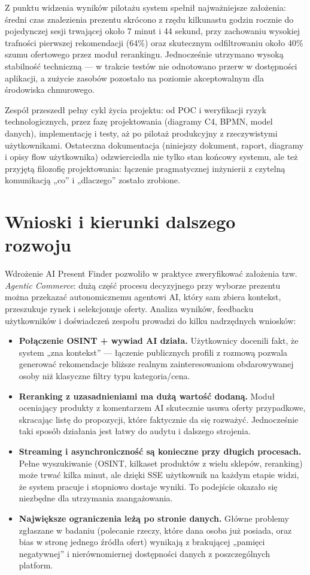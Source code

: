 \documentclass[12pt,a4paper]{article}
\begin{document}
Z punktu widzenia wyników pilotażu system spełnił najważniejsze założenia: średni czas znalezienia prezentu skrócono z rzędu kilkunastu godzin rocznie do pojedynczej sesji trwającej około 7 minut i 44 sekund, przy zachowaniu wysokiej trafności pierwszej rekomendacji (64\%) oraz skutecznym odfiltrowaniu około 40\% szumu ofertowego przez moduł rerankingu. Jednocześnie utrzymano wysoką stabilność techniczną — w trakcie testów nie odnotowano przerw w dostępności aplikacji, a zużycie zasobów pozostało na poziomie akceptowalnym dla środowiska chmurowego.

Zespół przeszedł pełny cykl życia projektu: od POC i weryfikacji ryzyk technologicznych, przez fazę projektowania (diagramy C4, BPMN, model danych), implementację i testy, aż po pilotaż produkcyjny z rzeczywistymi użytkownikami. Ostateczna dokumentacja (niniejszy dokument, raport, diagramy i opisy flow użytkownika) odzwierciedla nie tylko stan końcowy systemu, ale też przyjętą filozofię projektowania: łączenie pragmatycznej inżynierii z czytelną komunikacją „co” i „dlaczego” zostało zrobione.

\section{Wnioski i kierunki dalszego rozwoju}

Wdrożenie AI Present Finder pozwoliło w praktyce zweryfikować założenia tzw. \textit{Agentic Commerce}: dużą część procesu decyzyjnego przy wyborze prezentu można przekazać autonomicznemu agentowi AI, który sam zbiera kontekst, przeszukuje rynek i selekcjonuje oferty. Analiza wyników, feedbacku użytkowników i doświadczeń zespołu prowadzi do kilku nadrzędnych wniosków:
\begin{itemize}
    \item \textbf{Połączenie OSINT + wywiad AI działa.} Użytkownicy docenili fakt, że system „zna kontekst” — łączenie publicznych profili z rozmową pozwala generować rekomendacje bliższe realnym zainteresowaniom obdarowywanej osoby niż klasyczne filtry typu kategoria/cena.
    \item \textbf{Reranking z uzasadnieniami ma dużą wartość dodaną.} Moduł oceniający produkty z komentarzem AI skutecznie usuwa oferty przypadkowe, skracając listę do propozycji, które faktycznie da się rozważyć. Jednocześnie taki sposób działania jest łatwy do audytu i dalszego strojenia.
    \item \textbf{Streaming i asynchroniczność są konieczne przy długich procesach.} Pełne wyszukiwanie (OSINT, kilkaset produktów z wielu sklepów, reranking) może trwać kilka minut, ale dzięki SSE użytkownik na każdym etapie widzi, że system pracuje i stopniowo dostaje wyniki. To podejście okazało się niezbędne dla utrzymania zaangażowania.
    \item \textbf{Największe ograniczenia leżą po stronie danych.} Główne problemy zgłaszane w badaniu (polecanie rzeczy, które dana osoba już posiada, oraz bias w stronę jednego źródła ofert) wynikają z brakującej „pamięci negatywnej” i nierównomiernej dostępności danych z poszczególnych platform.
\end{itemize}
\end{document}
